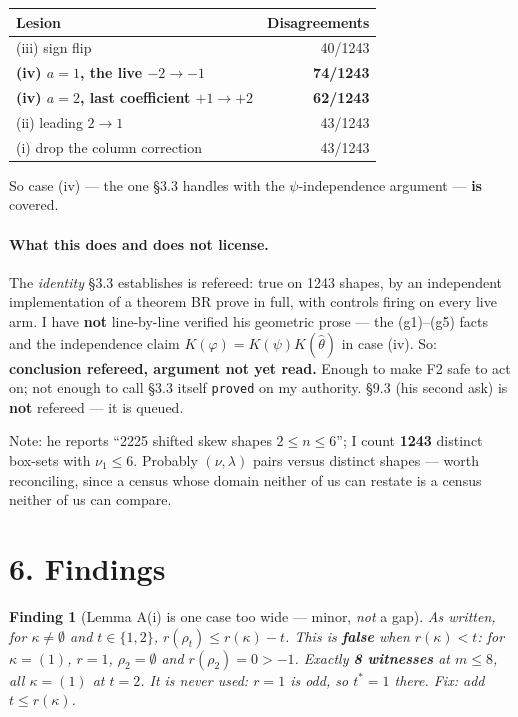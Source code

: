 \documentclass[11pt,a4paper]{article}
\newtheorem{finding}{Finding}
\theoremstyle{remark}
\newcommand{\wh}[1]{\widehat{#1}}
\begin{document}
\begin{center}
\small
\begin{tabular}{p{7.4cm}r}
\toprule
\textbf{Lesion} & \textbf{Disagreements} \\
\midrule
(iii) sign flip & 40/1243 \\
\textbf{(iv) $a{=}1$, the live $-2\to-1$} & \textbf{74/1243} \\
\textbf{(iv) $a{=}2$, last coefficient $+1\to+2$} & \textbf{62/1243} \\
(ii) leading $2\to1$ & 43/1243 \\
(i) drop the column correction & 43/1243 \\
\bottomrule
\end{tabular}
\end{center}

\noindent So case (iv) --- the one \S3.3 handles with the $\psi$-independence argument ---
\textbf{is} covered.

\paragraph{What this does and does not license.} The \emph{identity} \S3.3 establishes is
refereed: true on 1243 shapes, by an independent implementation of a theorem BR prove in full,
with controls firing on every live arm. I have \textbf{not} line-by-line verified his geometric
prose --- the (g1)--(g5) facts and the independence claim $K(\varphi)=K(\psi)K(\wh\theta)$ in
case (iv). So: \textbf{conclusion refereed, argument not yet read.} Enough to make F2 safe to
act on; not enough to call \S3.3 itself \texttt{proved} on my authority. \S9.3 (his second ask)
is \textbf{not} refereed --- it is queued.

Note: he reports ``2225 shifted skew shapes $2\le n\le6$''; I count \textbf{1243} distinct
box-sets with $\nu_1\le6$. Probably $(\nu,\lambda)$ pairs versus distinct shapes --- worth
reconciling, since a census whose domain neither of us can restate is a census neither of us can
compare.

\section*{6. Findings}

\begin{finding}[Lemma A(i) is one case too wide --- minor, \emph{not} a gap]
As written, for $\kappa\neq\emptyset$ and $t\in\{1,2\}$, $r(\rho_t)\le r(\kappa)-t$. This is
\textbf{false} when $r(\kappa)<t$: for $\kappa=(1)$, $r=1$, $\rho_2=\emptyset$ and
$r(\rho_2)=0>-1$. Exactly \textbf{8 witnesses} at $m\le8$, all $\kappa=(1)$ at $t=2$. It is
\emph{never used}: $r=1$ is odd, so $t^*=1$ there. Fix: add $t\le r(\kappa)$.
\end{finding}
\end{document}

